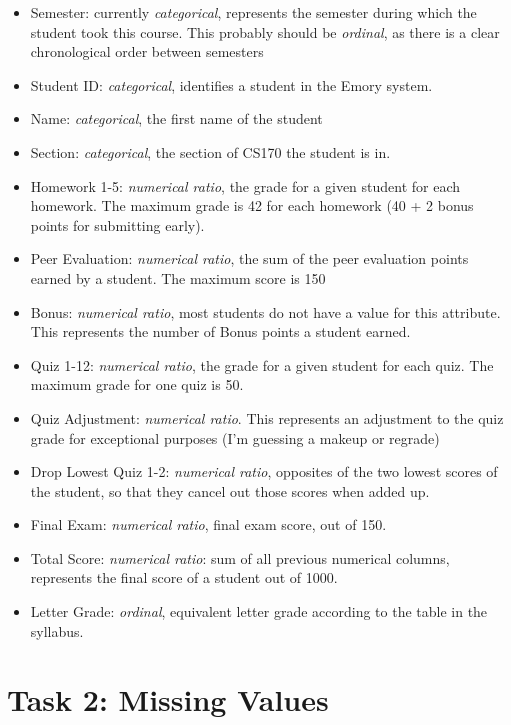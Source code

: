 \documentclass[12pt,letterpaper]{article}
\begin{document}
\begin{itemize}
    \item 
    Semester: currently \textit{categorical}, represents the semester during which the student took this course. This probably should be \textit{ordinal}, as there is a clear chronological order between semesters
    \item
    Student ID: \textit{categorical}, identifies a student in the Emory system. 
    \item
    Name: \textit{categorical}, the first name of the student
    \item
    Section: \textit{categorical}, the section of CS170 the student is in.
    \item
    Homework 1-5: \textit{numerical ratio}, the grade for a given student for each homework. The maximum grade is 42 for each homework (40 + 2 bonus points for submitting early).
    \item
    Peer Evaluation: \textit{numerical ratio}, the sum of the peer evaluation points earned by a student. The maximum score is 150
    \item
    Bonus: \textit{numerical ratio}, most students do not have a value for this attribute. This represents the number of Bonus points a student earned.
    \item
    Quiz 1-12: \textit{numerical ratio}, the grade for a given student for each quiz. The maximum grade for one quiz is 50.
    \item
    Quiz Adjustment: \textit{numerical ratio}. This represents an adjustment to the quiz grade for exceptional purposes (I'm guessing a makeup or regrade) 
    \item
    Drop Lowest Quiz 1-2: \textit{numerical ratio}, opposites of the two lowest scores of the student, so that they cancel out those scores when added up.
    \item
    Final Exam: \textit{numerical ratio}, final exam score, out of 150.
    \item
    Total Score: \textit{numerical ratio}: sum of all previous numerical columns, represents the final score of a student out of 1000.
    \item
    Letter Grade: \textit{ordinal}, equivalent letter grade according to the table in the syllabus.
\end{itemize}

\section*{Task 2: Missing Values}
\end{document}
